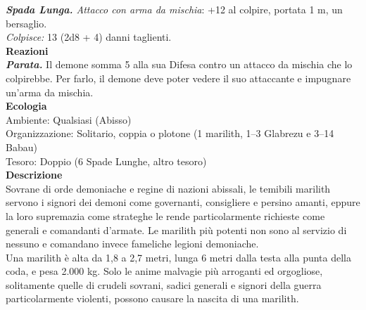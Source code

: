 \begin{multicols}{2}
\emph{\textbf{Spada Lunga.} Attacco con arma da mischia}: +12 al colpire, portata 1 m, un bersaglio.\\
\emph{Colpisce:} 13 (2d8 + 4) danni taglienti.\\
\textbf{Reazioni}\\
\emph{\textbf{Parata.}} Il demone somma 5 alla sua Difesa contro un attacco da mischia che lo colpirebbe. Per farlo, il demone deve poter vedere il suo attaccante e impugnare un'arma da mischia.\\
\textbf{Ecologia}\\
Ambiente: Qualsiasi (Abisso)\\
Organizzazione: Solitario, coppia o plotone (1 marilith, 1–3 Glabrezu e 3–14 Babau)\\
Tesoro: Doppio (6 Spade Lunghe, altro tesoro)\\
\textbf{Descrizione}\\
Sovrane di orde demoniache e regine di nazioni abissali, le temibili marilith servono i signori dei demoni come governanti, consigliere e persino amanti, eppure la loro supremazia come strateghe le rende particolarmente richieste come generali e comandanti d’armate. Le marilith più potenti non sono al servizio di nessuno e comandano invece fameliche legioni demoniache.\\
Una marilith è alta da 1,8 a 2,7 metri, lunga 6 metri dalla testa alla punta della coda, e pesa 2.000 kg. Solo le anime malvagie più arroganti ed orgogliose, solitamente quelle di crudeli sovrani, sadici generali e signori della guerra particolarmente violenti, possono causare la nascita di una marilith.\\


\end{multicols}
